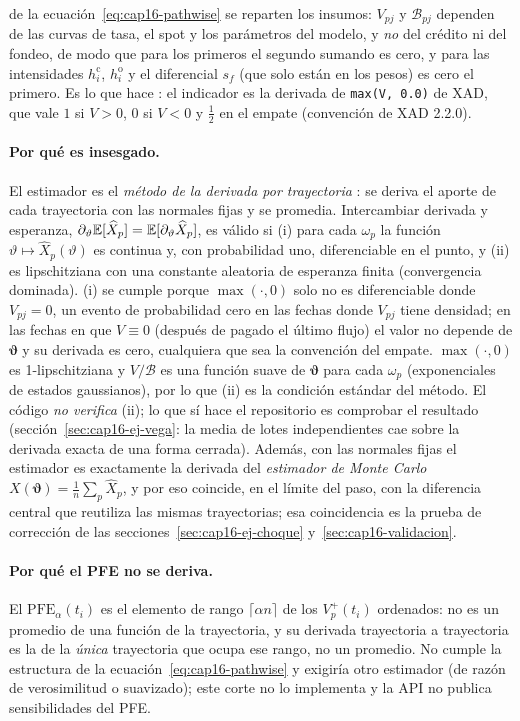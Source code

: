 \begin{sloppypar}
de la ecuación~\eqref{eq:cap16-pathwise} se reparten los insumos: $V_{pj}$ y $\mathcal B_{pj}$ dependen de las curvas
de tasa, el spot y los parámetros del modelo, y \emph{no} del crédito ni del fondeo, de modo que para los primeros el segundo sumando es cero, y
para las intensidades $h^{\mathrm c}_i$, $h^{\mathrm o}_i$ y el diferencial $s_f$ (que solo están en los pesos) es cero el
primero. Es lo que hace : el indicador es la derivada de \texttt{max(V, 0.0)} de XAD, que vale $1$ si
$V>0$, $0$ si $V<0$ y $\tfrac12$ en el empate (convención de XAD 2.2.0).

\paragraph{Por qué es insesgado.} El estimador es el \emph{método de la derivada por trayectoria}
\citep{broadie1996,glasserman2003}: se deriva el aporte de cada trayectoria con las normales fijas y se promedia.
Intercambiar derivada y esperanza, $\partial_{\vartheta}\mathbb{E}[\widehat X_p]=\mathbb{E}[\partial_{\vartheta}\widehat X_p]$, es válido si
(i) para cada $\omega_p$ la función $\vartheta\mapsto\widehat X_p(\vartheta)$ es continua y, con probabilidad uno,
diferenciable en el punto, y (ii) es lipschitziana con una constante aleatoria de esperanza finita
(convergencia dominada). (i) se cumple porque $\max(\cdot,0)$ solo no es diferenciable donde $V_{pj}=0$, un evento de
probabilidad cero en las fechas donde $V_{pj}$ tiene densidad; en las fechas en que $V\equiv0$ (después de pagado el
último flujo) el valor no depende de $\boldsymbol\vartheta$ y su derivada es cero, cualquiera que sea la convención del
empate. $\max(\cdot,0)$ es 1-lipschitziana y $V/\mathcal B$ es una función suave de $\boldsymbol\vartheta$ para cada $\omega_p$
(exponenciales de estados gaussianos), por lo que (ii) es la condición estándar del método. El código \emph{no
verifica} (ii); lo que sí hace el repositorio es comprobar el resultado (sección~\ref{sec:cap16-ej-vega}: la media de
lotes independientes cae sobre la derivada exacta de una forma cerrada). Además, con las normales fijas el
estimador es exactamente la derivada del \emph{estimador de Monte Carlo} $X(\boldsymbol\vartheta)=\tfrac1n\sum_p\widehat X_p$,
y por eso coincide, en el límite del paso, con la diferencia central que reutiliza las mismas trayectorias; esa
coincidencia es la prueba de corrección de las secciones~\ref{sec:cap16-ej-choque} y~\ref{sec:cap16-validacion}.

\paragraph{Por qué el PFE no se deriva.} El $\mathrm{PFE}_\alpha(t_i)$ es el elemento de rango $\lceil\alpha n\rceil$
de los $V^+_p(t_i)$ ordenados: no es un promedio de una función de la trayectoria, y su derivada trayectoria a
trayectoria es la de la \emph{única} trayectoria que ocupa ese rango, no un promedio. No cumple la estructura de la
ecuación~\eqref{eq:cap16-pathwise} y exigiría otro estimador (de razón de verosimilitud o suavizado); este corte no
lo implementa y la API no publica sensibilidades del PFE.


\end{sloppypar}
